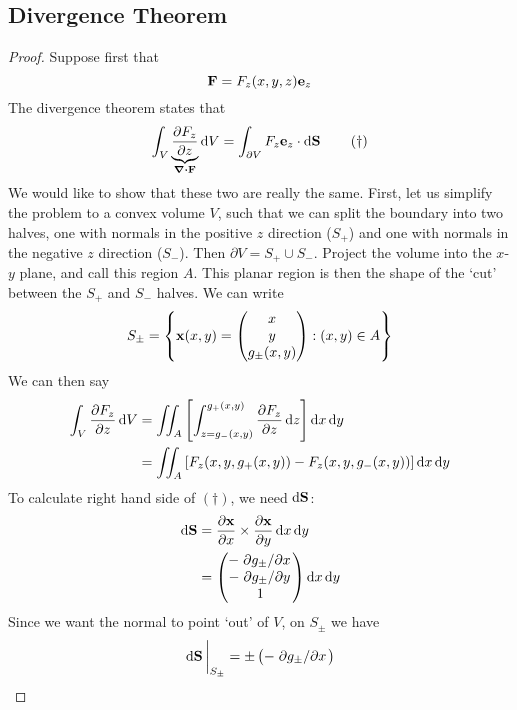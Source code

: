 \subsection{Divergence Theorem}
\begin{proof}
	Suppose first that
	\[
		\vb F = F_z(x,y,z) \vb e_z
	\]
	The divergence theorem states that
	\begin{equation}
		\int_V \underbrace{\pdv{F_z}{z}}_{\div{\vb F}} \dd{V} = \int_{\partial V} F_z \vb e_z \cdot \dd{\vb S}
		\tag{\(\dagger\)}
	\end{equation}
	We would like to show that these two are really the same.
	First, let us simplify the problem to a convex volume \(V\), such that we can split the boundary into two halves, one with normals in the positive \(z\) direction (\(S_+\)) and one with normals in the negative \(z\) direction (\(S_-\)).
	Then \(\partial V = S_+ \cup S_-\).
	Project the volume into the \(x\)-\(y\) plane, and call this region \(A\).
	This planar region is then the shape of the `cut' between the \(S_+\) and \(S_-\) halves.
	We can write
	\[
		S_\pm = \left\{ \vb x(x, y) = \begin{pmatrix}
			x \\ y \\ g_\pm (x, y)
		\end{pmatrix} : (x, y) \in A \right\}
	\]
	We can then say
	\begin{align*}
		\int_V \pdv{F_z}{z} \dd{V} & = \iint_{A} \left[ \int_{z = g_- (x, y)}^{g_+ (x, y)} \pdv{F_z}{z} \dd{z} \right] \dd{x} \dd{y} \\
		                           & = \iint_A \left[ F_z(x, y, g_+ (x, y)) - F_z(x, y, g_- (x, y)) \right] \dd{x}\dd{y}
	\end{align*}
	To calculate right hand side of \((\dagger)\), we need \(\dd{\vb S}\):
	\begin{align*}
		\dd{\vb S} & = \pdv{\vb x}{x} \times \pdv{\vb x}{y} \dd{x}\dd{y} \\
		           & = \begin{pmatrix}
			-\pdv*{g_\pm}{x} \\
			-\pdv*{g_\pm}{y} \\
			1                \\
		\end{pmatrix} \dd{x}\dd{y}
	\end{align*}
	Since we want the normal to point `out' of \(V\), on \(S_\pm\) we have
	\[
		\eval{\dd{\vb S}}_{S_\pm} = \pm \begin{pmatrix}
			-\pdv*{g_\pm}{x} \\

\end{pmatrix}\]
\end{proof}
